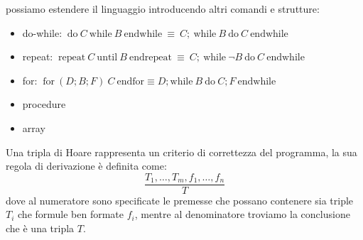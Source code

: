 possiamo estendere il linguaggio introducendo altri comandi e strutture:
\begin{itemize}
    \item do-while: $\ \text{do} \ C \ \text{while} \ B \ \text{endwhile} \
              \equiv \ C; \ \text{while} \ B \ \text{do} \ C \ \text{endwhile}$
    \item repeat: $ \ \text{repeat} \ C \ \text{until} \ B \ \text{endrepeat} \
              \equiv \ C; \ \text{while} \ \lnot B \ \text{do} \ C \ \text{endwhile} $
    \item for: $ \ \text{for} \ (D;B;F) \ C \ \text{endfor} \equiv D;
              \text{while} \ B \ \text{do} \ C; F \ \text{endwhile}$
    \item procedure
    \item array
\end{itemize}
Una tripla di Hoare rappresenta un criterio di correttezza del programma, la sua
regola di derivazione è definita come:
\begin{equation}
    \frac{T_1, \dots, T_m, f_1, \dots, f_n}{T}
\end{equation}
dove al numeratore sono specificate le premesse che possano contenere sia triple
$T_i$ che formule ben formate $f_i$, mentre al denominatore troviamo la conclusione
che è una tripla $T$.

